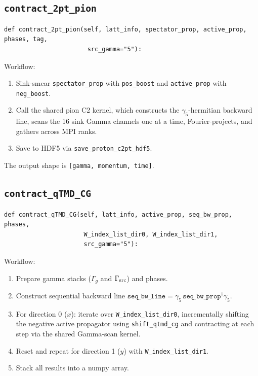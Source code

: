 \documentclass[11pt,a4paper]{article}
\begin{document}
\subsection{\texttt{contract\_2pt\_pion}}

\begin{lstlisting}
def contract_2pt_pion(self, latt_info, spectator_prop, active_prop, phases, tag,
                       src_gamma="5"):
\end{lstlisting}

Workflow:
\begin{enumerate}[nosep]
  \item Sink-smear \texttt{spectator\_prop} with \texttt{pos\_boost} and
        \texttt{active\_prop} with \texttt{neg\_boost}.
  \item Call the shared pion C2 kernel, which constructs the
        $\gamma_5$-hermitian backward line, scans the 16 sink Gamma channels
        one at a time, Fourier-projects, and gathers across MPI ranks.
  \item Save to HDF5 via \texttt{save\_proton\_c2pt\_hdf5}.
\end{enumerate}

The output shape is \texttt{[gamma, momentum, time]}.

\subsection{\texttt{contract\_qTMD\_CG}}

\begin{lstlisting}
def contract_qTMD_CG(self, latt_info, active_prop, seq_bw_prop, phases,
                      W_index_list_dir0, W_index_list_dir1,
                      src_gamma="5"):
\end{lstlisting}

Workflow:
\begin{enumerate}[nosep]
  \item Prepare gamma stacks ($\Gamma_g$ and $\Gamma_{\rm src}$) and phases.
  \item Construct sequential backward line
        $\texttt{seq\_bw\_line} = \gamma_5\,
        \texttt{seq\_bw\_prop}^\dagger \gamma_5$.
  \item For direction 0 ($x$): iterate over \texttt{W\_index\_list\_dir0},
        incrementally shifting the negative active propagator using
        \verb|shift_qtmd_cg| and contracting at each step via
        the shared Gamma-scan kernel.
  \item Reset and repeat for direction 1 ($y$) with
        \texttt{W\_index\_list\_dir1}.
  \item Stack all results into a numpy array.
\end{enumerate}
\end{document}
